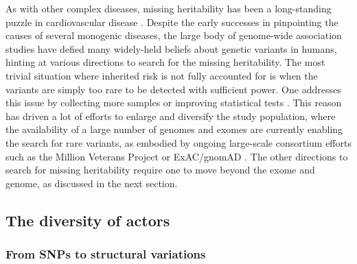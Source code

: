 \documentclass[letter]{bioinfo}
\newcommand{\comment}[1]{\textcolor{red}{#1}}
\begin{document}
As with other complex diseases, missing heritability has been a long-standing puzzle in cardiovascular disease \citep{Manolio:2009:Finding}. Despite the early successes in pinpointing the causes of several monogenic diseases, the large body of genome-wide association studies have defied many widely-held beliefs about genetic variants in humans, hinting at various directions to search for the missing heritability.  The most trivial situation where inherited risk is not fully accounted for is when the variants are simply too rare to be detected with sufficient power. One addresses this issue by collecting more samples \citep{Visscher:2017:10} or improving statistical tests \citep{Zuk:2014:Searching,Kaakinen:2017:rarevariant}.  This reason has driven a lot of efforts to enlarge and diversify the study population, where the availability of a large number of genomes and exomes are currently enabling the search for rare variants, as embodied by ongoing large-scale consortium efforts such as the Million Veterans Project \citep{Gaziano:2016:Million} or ExAC/gnomAD \citep{Lek:2016:Analysis}. The other directions to search for missing heritability require one to move beyond the exome and genome, as discussed in the next section.
	
	
	
	
\subsection*{The diversity of actors}

\subsubsection*{From SNPs to structural variations}
	
	
\end{document}
